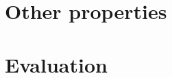 \section{Other properties} \label{sec:02_other_properties}

\section{Evaluation} \label{sec:02_evaluation}
